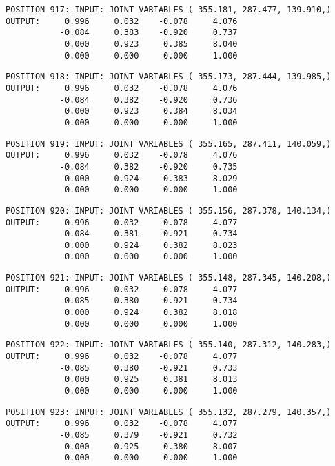 \begin{verbatim}
POSITION 917: INPUT: JOINT VARIABLES ( 355.181, 287.477, 139.910,)
OUTPUT:     0.996     0.032    -0.078     4.076
           -0.084     0.383    -0.920     0.737
            0.000     0.923     0.385     8.040
            0.000     0.000     0.000     1.000
\end{verbatim} \pagebreak[1]\begin{verbatim}
POSITION 918: INPUT: JOINT VARIABLES ( 355.173, 287.444, 139.985,)
OUTPUT:     0.996     0.032    -0.078     4.076
           -0.084     0.382    -0.920     0.736
            0.000     0.923     0.384     8.034
            0.000     0.000     0.000     1.000
\end{verbatim} \pagebreak[1]\begin{verbatim}
POSITION 919: INPUT: JOINT VARIABLES ( 355.165, 287.411, 140.059,)
OUTPUT:     0.996     0.032    -0.078     4.076
           -0.084     0.382    -0.920     0.735
            0.000     0.924     0.383     8.029
            0.000     0.000     0.000     1.000
\end{verbatim} \pagebreak[1]\begin{verbatim}
POSITION 920: INPUT: JOINT VARIABLES ( 355.156, 287.378, 140.134,)
OUTPUT:     0.996     0.032    -0.078     4.077
           -0.084     0.381    -0.921     0.734
            0.000     0.924     0.382     8.023
            0.000     0.000     0.000     1.000
\end{verbatim} \pagebreak[1]\begin{verbatim}
POSITION 921: INPUT: JOINT VARIABLES ( 355.148, 287.345, 140.208,)
OUTPUT:     0.996     0.032    -0.078     4.077
           -0.085     0.380    -0.921     0.734
            0.000     0.924     0.382     8.018
            0.000     0.000     0.000     1.000
\end{verbatim} \pagebreak[1]\begin{verbatim}
POSITION 922: INPUT: JOINT VARIABLES ( 355.140, 287.312, 140.283,)
OUTPUT:     0.996     0.032    -0.078     4.077
           -0.085     0.380    -0.921     0.733
            0.000     0.925     0.381     8.013
            0.000     0.000     0.000     1.000
\end{verbatim} \pagebreak[1]\begin{verbatim}
POSITION 923: INPUT: JOINT VARIABLES ( 355.132, 287.279, 140.357,)
OUTPUT:     0.996     0.032    -0.078     4.077
           -0.085     0.379    -0.921     0.732
            0.000     0.925     0.380     8.007
            0.000     0.000     0.000     1.000
\end{verbatim} \pagebreak[1]\begin{verbatim}

\end{verbatim}
